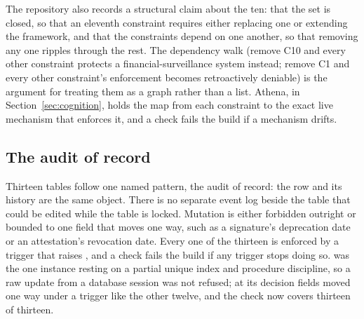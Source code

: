 The repository also records a structural claim about the ten: that the set is closed, so that an
eleventh constraint requires either replacing one or extending the framework, and that the
constraints depend on one another, so that removing any one ripples through the rest. The
dependency walk (remove C10 and every other constraint protects a financial-surveillance system
instead; remove C1 and every other constraint's enforcement becomes retroactively deniable) is the
argument for treating them as a graph rather than a list. Athena, in Section~\ref{sec:cognition},
holds the map from each constraint to the exact live mechanism that enforces it, and a check fails
the build if a mechanism drifts.


\subsection{The audit of record}

Thirteen tables follow one named pattern, the audit of record: the row and its history are the same
object. There is no separate event log beside the table that could be edited while the table is
locked. Mutation is either forbidden outright or bounded to one field that moves one way, such as a
signature's deprecation date or an attestation's revocation date. Every one of the thirteen is
enforced by a trigger that raises , and a check fails the build if any
trigger stops doing so.  was the one instance resting on a partial unique
index and procedure discipline, so a raw update from a database session was not refused; at
 its decision fields moved one way under a trigger like the other twelve, and the check
now covers thirteen of thirteen. \sImpl

